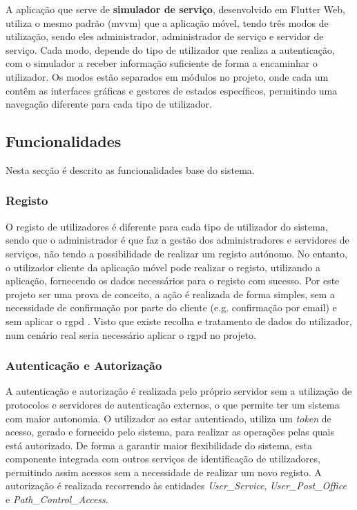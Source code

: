 {A aplicação que serve de \textbf{simulador de serviço}, desenvolvido em Flutter Web, utiliza o mesmo padrão (\acrshort{mvvm}) que a aplicação móvel, tendo três modos de utilização, sendo eles administrador, administrador de serviço e servidor de serviço. Cada modo, depende do tipo de utilizador que realiza a autenticação, com o simulador a receber informação suficiente de forma a encaminhar o utilizador. Os modos estão separados em módulos no projeto, onde cada um contêm as interfaces gráficas e gestores de estados específicos, permitindo uma navegação diferente para cada tipo de utilizador.  

\subsection{Funcionalidades} 
Nesta secção é descrito as funcionalidades base do sistema.

\subsubsection{Registo}
O registo de utilizadores é diferente para cada tipo de utilizador do sistema, sendo que o administrador é que faz a gestão dos administradores e servidores de serviços, não tendo a possibilidade de realizar um registo autónomo. No entanto, o utilizador cliente da aplicação móvel pode realizar o registo, utilizando a aplicação, fornecendo os dados necessários para o registo com sucesso. Por este projeto ser uma prova de conceito, a ação é realizada de forma simples, sem a necessidade de confirmação por parte do cliente (e.g. confirmação por email) e sem aplicar o \acrfull{rgpd} \cite{rgpd}. Visto que existe recolha e tratamento de dados do utilizador, num cenário real seria necessário aplicar o \acrshort{rgpd} no projeto.

\subsubsection{Autenticação e Autorização} 
A autenticação e autorização é realizada pelo próprio servidor sem a utilização de protocolos e servidores de autenticação externos, o que permite ter um sistema com maior autonomia. O utilizador ao estar autenticado, utiliza um \textit{token} de acesso, gerado e fornecido pelo sistema, para realizar as operações pelas quais está autorizado. De forma a garantir maior flexibilidade do sistema, esta componente integrada com outros serviços de identificação de utilizadores, permitindo assim acessos sem a necessidade de realizar um novo registo. A autorização é realizada recorrendo às entidades \textit{User\_Service}, \textit{User\_Post\_Office} e \textit{Path\_Control\_Access}.

}
